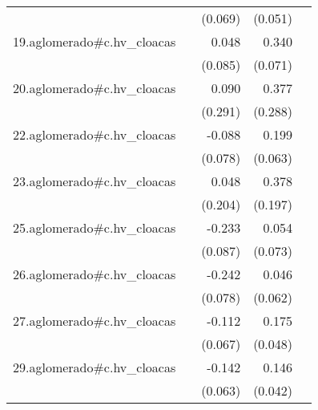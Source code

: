 {\begin{longtable}{l*{4}{D{.}{.}{-1}}}
            &                     &     (0.069)         &     (0.051)         &                     \\
\addlinespace
19.aglomerado#c.hv\_cloacas&                     &       0.048         &       0.340\sym{***}&                     \\
            &                     &     (0.085)         &     (0.071)         &                     \\
\addlinespace
20.aglomerado#c.hv\_cloacas&                     &       0.090         &       0.377         &                     \\
            &                     &     (0.291)         &     (0.288)         &                     \\
\addlinespace
22.aglomerado#c.hv\_cloacas&                     &      -0.088         &       0.199\sym{**} &                     \\
            &                     &     (0.078)         &     (0.063)         &                     \\
\addlinespace
23.aglomerado#c.hv\_cloacas&                     &       0.048         &       0.378         &                     \\
            &                     &     (0.204)         &     (0.197)         &                     \\
\addlinespace
25.aglomerado#c.hv\_cloacas&                     &      -0.233\sym{**} &       0.054         &                     \\
            &                     &     (0.087)         &     (0.073)         &                     \\
\addlinespace
26.aglomerado#c.hv\_cloacas&                     &      -0.242\sym{**} &       0.046         &                     \\
            &                     &     (0.078)         &     (0.062)         &                     \\
\addlinespace
27.aglomerado#c.hv\_cloacas&                     &      -0.112         &       0.175\sym{***}&                     \\
            &                     &     (0.067)         &     (0.048)         &                     \\
\addlinespace
29.aglomerado#c.hv\_cloacas&                     &      -0.142\sym{*}  &       0.146\sym{***}&                     \\
            &                     &     (0.063)         &     (0.042)         &                     \\

\end{longtable}}
